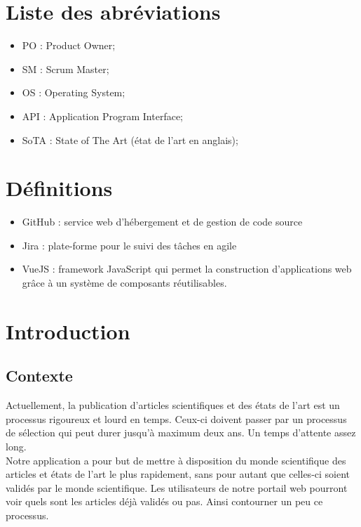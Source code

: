 \documentclass[t, 12pt, usenames,dvipsnames]{article}
\begin{document}
    \newpage
    \tableofcontents
    
    \newpage
    \section{Liste des abréviations}
        \begin{itemize}
            \item PO : Product Owner;
            \item SM : Scrum Master;
            \item OS : Operating System;
            \item API : Application Program Interface;
            \item SoTA : State of The Art (état de l'art en anglais);
        \end{itemize}
    
    \section{Définitions}
        \begin{itemize}
            \item GitHub : service web d'hébergement et de gestion de code source
            \item Jira : plate-forme pour le suivi des tâches en agile
            \item VueJS : framework JavaScript qui permet la construction d'applications web grâce à un système de composants réutilisables.
        \end{itemize}
    \newpage
    \section{Introduction}
    
        \subsection{Contexte}
            \noindent Actuellement, la publication d'articles scientifiques et des états de l'art est un processus rigoureux et lourd en temps. Ceux-ci doivent passer par un processus de sélection qui peut durer jusqu'à maximum deux ans. Un temps d'attente assez long.\\
            Notre application a pour but de mettre à disposition du monde scientifique des articles et états de l'art le plus rapidement, sans pour autant que celles-ci soient validés par le monde scientifique. Les utilisateurs de notre portail web pourront voir quels sont les articles déjà validés ou pas. Ainsi contourner un peu ce processus. 
            
\end{document}
